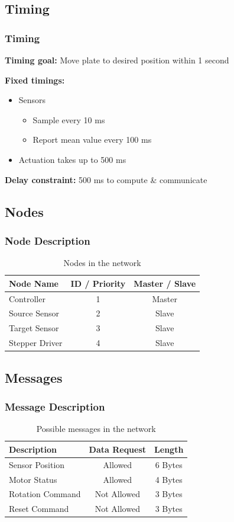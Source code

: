 \documentclass{beamer}
\begin{document}
\subsection{Timing}
\begin{frame}
  \frametitle{Timing}
  \textbf{Timing goal:} Move plate to desired position within 1 second

  \vfill

  \textbf{Fixed timings:}
  \begin{itemize}
    \item Sensors
      \begin{itemize}
        \item Sample every 10 ms
        \item Report mean value every 100 ms
      \end{itemize}
    \item Actuation takes up to 500 ms
  \end{itemize}

  \vfill

  \textbf{Delay constraint:} 500 ms to compute \& communicate
\end{frame}

\subsection{Nodes}
\begin{frame}
  \frametitle{Node Description}
  \begin{table}
\begin{tabular}{l | c | c }
Node Name & ID / Priority & Master / Slave \\
\hline \hline
Controller & 1 & Master \\
Source Sensor & 2 & Slave \\
Target Sensor & 3 & Slave \\
Stepper Driver & 4 & Slave
\end{tabular}
\caption{Nodes in the network}
\end{table}
\end{frame}

\subsection{Messages}
\begin{frame}
  \frametitle{Message Description}
  \begin{table}
\begin{tabular}{l | c | c }
Description & Data Request & Length \\
\hline \hline
Sensor Position   & Allowed     & 6 Bytes \\
Motor Status      & Allowed     & 4 Bytes \\
Rotation Command  & Not Allowed & 3 Bytes \\
Reset Command     & Not Allowed & 3 Bytes
\end{tabular}
\caption{Possible messages in the network}
\end{table}
\end{frame}
\end{document}
